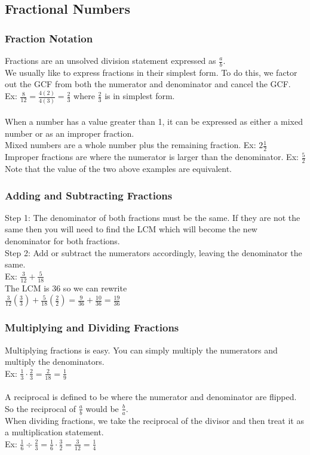 \documentclass[11pt, fleqn]{article}
\begin{document}
\subsection{Fractional Numbers}

\subsubsection{Fraction Notation}
Fractions are an unsolved division statement expressed as $\frac{a}{b}$.\\
We usually like to express fractions in their simplest form. To do this, we factor out the GCF from both the numerator and denominator and cancel the GCF.\\
Ex: $\frac{8}{12}=\frac{4(2)}{4(3)}=\frac{2}{3}$ where $\frac{2}{3}$ is in simplest form.\\
\\
When a number has a value greater than 1, it can be expressed as either a mixed number or as an improper fraction.\\
Mixed numbers are a whole number plus the remaining fraction. Ex: $2\frac{1}{2}$\\
Improper fractions are where the numerator is larger than the denominator. Ex: $\frac{5}{2}$\\
Note that the value of the two above examples are equivalent.\\

\subsubsection{Adding and Subtracting Fractions}
Step 1: The denominator of both fractions must be the same. If they are not the same then you will need to find the LCM which will become the new denominator for both fractions.\\
Step 2: Add or subtract the numerators accordingly, leaving the denominator the same.\\
Ex: $\frac{3}{12}+\frac{5}{18}$\\
The LCM is 36 so we can rewrite\\
$\frac{3}{12}\left(\frac{3}{3}\right)+\frac{5}{18}\left(\frac{2}{2}\right)=\frac{9}{36}+\frac{10}{36}=\frac{19}{36}$\\

\subsubsection{Multiplying and Dividing Fractions}
Multiplying fractions is easy. You can simply multiply the numerators and multiply the denominators.\\
Ex: $\frac{1}{3}\cdot\frac{2}{3}=\frac{2}{18}=\frac{1}{9}$\\
\\
A reciprocal is defined to be where the numerator and denominator are flipped. So the reciprocal of $\frac{a}{b}$ would be $\frac{b}{a}$.\\
When dividing fractions, we take the reciprocal of the divisor and then treat it as a multiplication statement.\\
Ex: $\frac{1}{6}\div\frac{2}{3}=\frac{1}{6}\cdot\frac{3}{2}=\frac{3}{12}=\frac{1}{4}$
\end{document}
